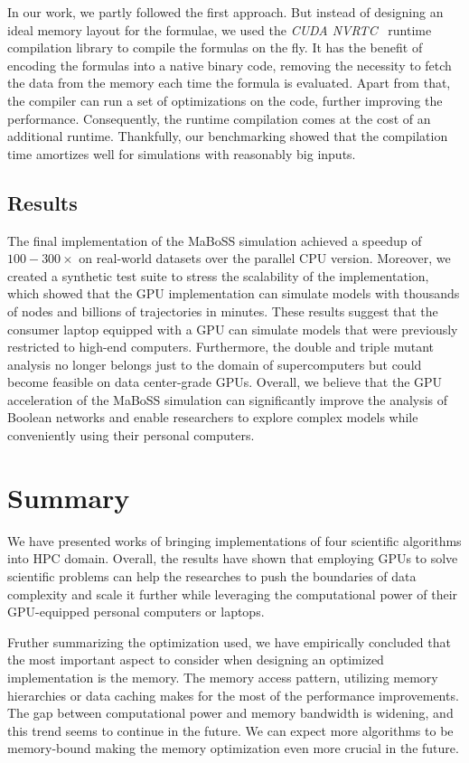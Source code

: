In our work, we partly followed the first approach. But instead of designing an ideal memory layout for the formulae, we used the \emph{CUDA NVRTC}~\cite{nvrtc-online} runtime compilation library to compile the formulas on the fly. It has the benefit of encoding the formulas into a native binary code, removing the necessity to fetch the data from the memory each time the formula is evaluated. Apart from that, the compiler can run a set of optimizations on the code, further improving the performance. Consequently, the runtime compilation comes at the cost of an additional runtime. Thankfully, our benchmarking showed that the compilation time amortizes well for simulations with reasonably big inputs.

\subsection{Results}

The final implementation of the MaBoSS simulation achieved a speedup of $100-300\times$ on real-world datasets over the parallel CPU version. Moreover, we created a synthetic test suite to stress the scalability of the implementation, which showed that the GPU implementation can simulate models with thousands of nodes and billions of trajectories in minutes. These results suggest that the consumer laptop equipped with a GPU can simulate models that were previously restricted to high-end computers. Furthermore, the double and triple mutant analysis no longer belongs just to the domain of supercomputers but could become feasible on data center-grade GPUs. Overall, we believe that the GPU acceleration of the MaBoSS simulation can significantly improve the analysis of Boolean networks and enable researchers to explore complex models while conveniently using their personal computers.

\section{Summary}

We have presented works of bringing implementations of four scientific algorithms into HPC domain. Overall, the results have shown that employing GPUs to solve scientific problems can help the researches to push the boundaries of data complexity and scale it further while leveraging the computational power of their GPU-equipped personal computers or laptops.

Fruther summarizing the optimization used, we have empirically concluded that the most important aspect to consider when designing an optimized implementation is the memory. The memory access pattern, utilizing memory hierarchies or data caching makes for the most of the performance improvements. The gap between computational power and memory bandwidth is widening, and this trend seems to continue in the future. We can expect more algorithms to be memory-bound making the memory optimization even more crucial in the future. 

